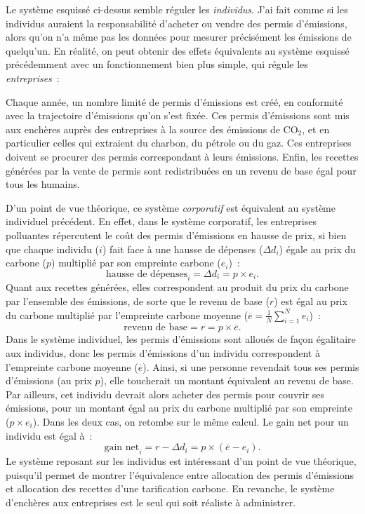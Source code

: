 \documentclass[a5paper,french]{memoir}
\begin{document}
Le système esquissé ci-dessus semble réguler les \textit{individus}. J'ai fait comme si les individus auraient la responsabilité d'acheter ou vendre des permis d'émissions, alors qu'on n'a même pas les données pour mesurer précisément les émissions de quelqu'un. En réalité, on peut obtenir des effets équivalents au système esquissé précédemment avec un fonctionnement bien plus simple, qui régule les \textit{entreprises}~: 

Chaque année, un nombre limité de permis d'émissions est créé, en conformité avec la trajectoire d'émissions qu'on s'est fixée. Ces permis d'émissions sont mis aux enchères auprès des entreprises à la source des émissions de CO$_\text{2}$, et en particulier celles qui extraient %
du charbon, du pétrole ou du gaz. Ces entreprises doivent se procurer des permis correspondant à leurs émissions. Enfin, les recettes générées par la vente de permis sont redistribuées en un revenu de base égal pour tous les humains. 

D'un point de vue théorique, ce système \textit{corporatif} est équivalent au système individuel précédent. En effet, dans le système corporatif, les entreprises polluantes répercutent le coût des permis d'émissions en hausse de prix, si bien que chaque individu ($i$) fait face à une hausse de dépenses ($\Delta d_i$) égale au prix du carbone ($p$) multiplié par son empreinte carbone ($e_i$)~: 
$$ \text{hausse de dépenses}_i = \Delta d_i = p \times e_i\text{.}$$
Quant aux recettes générées, elles correspondent au produit du prix du carbone par l'ensemble des émissions, de sorte que le revenu de base ($r$) est égal au prix du carbone multiplié par l'empreinte carbone moyenne ($\overline{e} = \frac{1}{N} \sum_{i=1}^N e_i$)~:  
$$ \text{revenu de base} = r = p \times \overline{e}\text{.}$$
Dans le système individuel, les permis d'émissions sont alloués de façon égalitaire aux individus, donc les permis d'émissions d'un individu correspondent à l'empreinte carbone moyenne ($\overline{e}$). Ainsi, si une personne revendait tous ses permis d'émissions (au prix $p$), elle toucherait un montant équivalent au revenu de base. Par ailleurs, cet individu devrait alors acheter des permis pour couvrir ses émissions, pour un montant égal au prix du carbone multiplié par son empreinte ($p \times e_i$). Dans les deux cas, on retombe sur le même calcul. Le gain net pour un individu est égal à~: 
$$\text{gain net}_i = r - \Delta d_i = p \times \left( \overline{e} - e_i \right)\text{.}$$
Le système reposant sur les individus est intéressant d'un point de vue théorique, puisqu'il permet de montrer l'équivalence entre allocation des permis d'émissions et allocation des recettes d'une tarification carbone. En revanche, le système d'enchères aux entreprises est le seul qui soit réaliste à administrer. 
\end{document}
